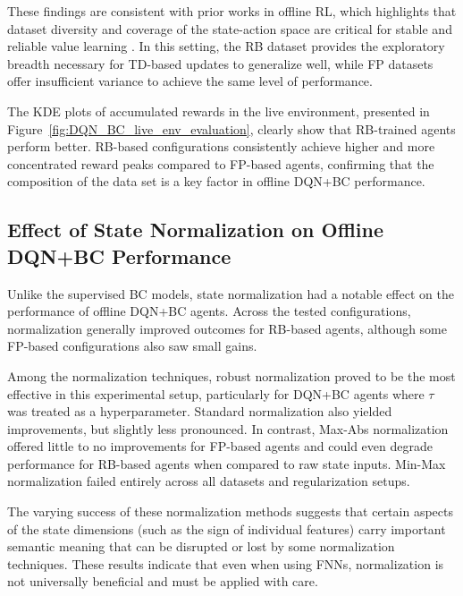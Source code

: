 These findings are consistent with prior works in offline RL, which highlights that dataset diversity and coverage of the state-action space are critical for stable and reliable value learning \cite{dataset_composition_rl_effects}. In this setting, the RB dataset provides the exploratory breadth necessary for TD-based updates to generalize well, while FP datasets offer insufficient variance to achieve the same level of performance.

The KDE plots of accumulated rewards in the live environment, presented in Figure~\ref{fig:DQN_BC_live_env_evaluation}, clearly show that RB-trained agents perform better. RB-based configurations consistently achieve higher and more concentrated reward peaks compared to FP-based agents, confirming that the composition of the data set is a key factor in offline DQN+BC performance.





\subsection{Effect of State Normalization on Offline DQN+BC Performance}
Unlike the supervised BC models, state normalization had a notable effect on the performance of offline DQN+BC agents. Across the tested configurations, normalization generally improved outcomes for RB-based agents, although some FP-based configurations also saw small gains.

Among the normalization techniques, robust normalization proved to be the most effective in this experimental setup, particularly for DQN+BC agents where $\tau$ was treated as a hyperparameter. Standard normalization also yielded improvements, but slightly less pronounced. In contrast, Max-Abs normalization offered little to no improvements for FP-based agents and could even degrade performance for RB-based agents when compared to raw state inputs. Min-Max normalization failed entirely across all datasets and regularization setups.

The varying success of these normalization methods suggests that certain aspects of the state dimensions (such as the sign of individual features) carry important semantic meaning that can be disrupted or lost by some normalization techniques. These results indicate that even when using FNNs, normalization is not universally beneficial and must be applied with care.









